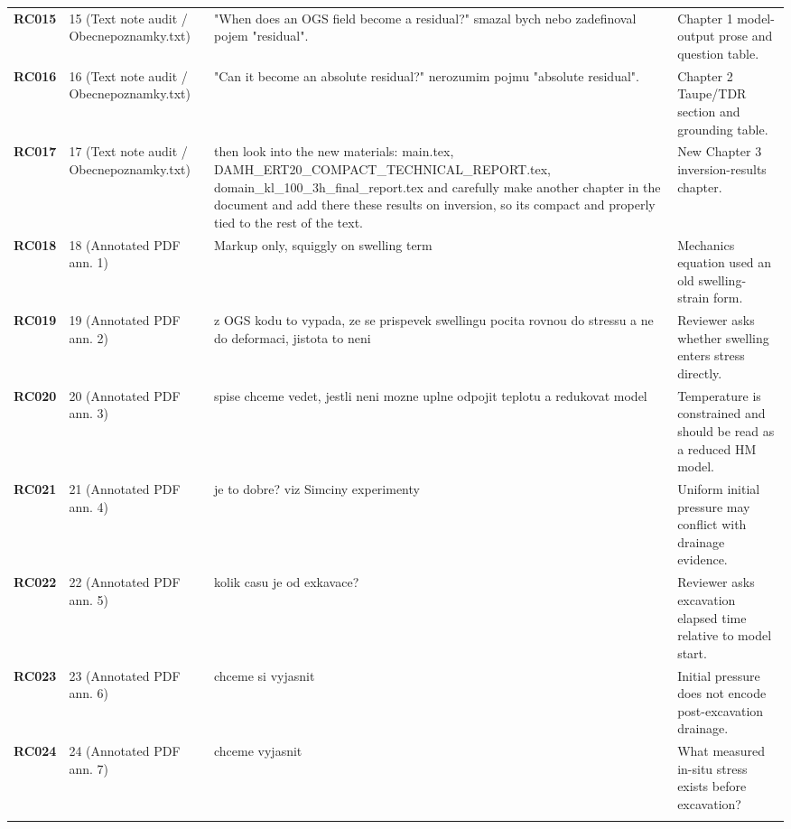 \begin{longtable}{@{}L{0.10\textwidth} L{0.14\textwidth} L{0.31\textwidth} L{0.37\textwidth}@{}}
\addlinespace[0.16em]
\textbf{RC015} & 15 (Text note audit / Obecnepoznamky.txt) & "When does an OGS field become a residual?" smazal bych nebo zadefinoval pojem "residual". & Chapter 1 model-output prose and question table.\\
\addlinespace[0.16em]
\textbf{RC016} & 16 (Text note audit / Obecnepoznamky.txt) & "Can it become an absolute residual?" nerozumim pojmu "absolute residual". & Chapter 2 Taupe/TDR section and grounding table.\\
\addlinespace[0.16em]
\textbf{RC017} & 17 (Text note audit / Obecnepoznamky.txt) & then look into the new materials: main.tex, DAMH\_\allowbreak{}ERT20\_\allowbreak{}COMPACT\_\allowbreak{}TECHNICAL\_\allowbreak{}REPORT.tex, domain\_\allowbreak{}kl\_\allowbreak{}100\_\allowbreak{}3h\_\allowbreak{}final\_\allowbreak{}report.tex and carefully make another chapter in the document and add there these results on inversion, so its compact and properly tied to the rest of the text. & New Chapter 3 inversion-results chapter.\\
\addlinespace[0.16em]
\textbf{RC018} & 18 (Annotated PDF ann. 1) & Markup only, squiggly on swelling term & Mechanics equation used an old swelling-strain form.\\
\addlinespace[0.16em]
\textbf{RC019} & 19 (Annotated PDF ann. 2) & z OGS kodu to vypada, ze se prispevek swellingu pocita rovnou do stressu a ne do deformaci, jistota to neni & Reviewer asks whether swelling enters stress directly.\\
\addlinespace[0.16em]
\textbf{RC020} & 20 (Annotated PDF ann. 3) & spise chceme vedet, jestli neni mozne uplne odpojit teplotu a redukovat model & Temperature is constrained and should be read as a reduced HM model.\\
\addlinespace[0.16em]
\textbf{RC021} & 21 (Annotated PDF ann. 4) & je to dobre? viz Simciny experimenty & Uniform initial pressure may conflict with drainage evidence.\\
\addlinespace[0.16em]
\textbf{RC022} & 22 (Annotated PDF ann. 5) & kolik casu je od exkavace? & Reviewer asks excavation elapsed time relative to model start.\\
\addlinespace[0.16em]
\textbf{RC023} & 23 (Annotated PDF ann. 6) & chceme si vyjasnit & Initial pressure does not encode post-excavation drainage.\\
\addlinespace[0.16em]
\textbf{RC024} & 24 (Annotated PDF ann. 7) & chceme vyjasnit & What measured in-situ stress exists before excavation?\\
\addlinespace[0.16em]

\end{longtable}
